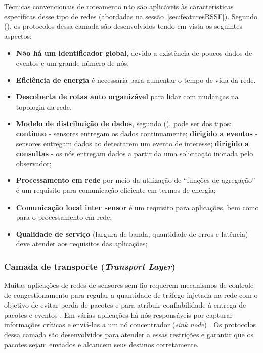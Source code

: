  Técnicas convencionais de roteamento não são aplicáveis às características específicas desse tipo de redes (abordadas na sessão~\ref{sec:featuresRSSF}). Segundo  (\citeyear{Guerses2005}), os protocolos dessa camada são desenvolvidos tendo em vista os seguintes aspectos:
 
 \begin{itemize}
 \item \textbf{Não há um identificador global}, devido a existência de poucos dados de eventos e um grande número de nós.
 \item \textbf{Eficiência de energia} é necessária para aumentar o tempo de vida da rede.
 \item \textbf{Descoberta de rotas auto organizável} para lidar com mudanças na topologia da rede.
 \item \textbf{Modelo de distribuição de dados}, segundo  (\citeyear{Tilak02ataxonomy}), pode ser dos tipos:
 \subitem \textbf{contínuo} - sensores entregam os dados continuamente;
 \subitem \textbf{dirigido a eventos} - sensores entregam dados ao detectarem um evento de interesse;
 \subitem \textbf{dirigido a consultas} - os nós entregam dados a partir da uma solicitação iniciada pelo observador;
 \item \textbf{Processamento em rede} por meio da utilização de ``funções de agregação'' é um requisito para comunicação eficiente em termos de energia;
 \item \textbf{Comunicação local inter sensor} é um requisito para aplicações, bem como para o processamento em rede;
 \item \textbf{Qualidade de serviço} (largura de banda, quantidade de erros e latência) deve atender aos requisitos das aplicações; 
 
 \end{itemize}

 \subsubsection{Camada de transporte (\emph{Transport Layer})} 
 
 Muitas aplicações de redes de sensores sem fio requerem mecanismos de controle de congestionamento para regular a quantidade de tráfego injetada na rede com o objetivo de evitar perda de pacotes e para atribuir confiabilidade à entrega de pacotes e eventos \cite{RaSaGu2008-InCol}. Em várias aplicações há nós responsáveis por capturar informações críticas e enviá-las a um nó concentrador (\textit{sink node}) \cite{RaSaGu2008-InCol}. Os protocolos dessa camada são desenvolvidos para atender a essas restrições e garantir que os pacotes sejam enviados e alcancem seus destinos corretamente.

